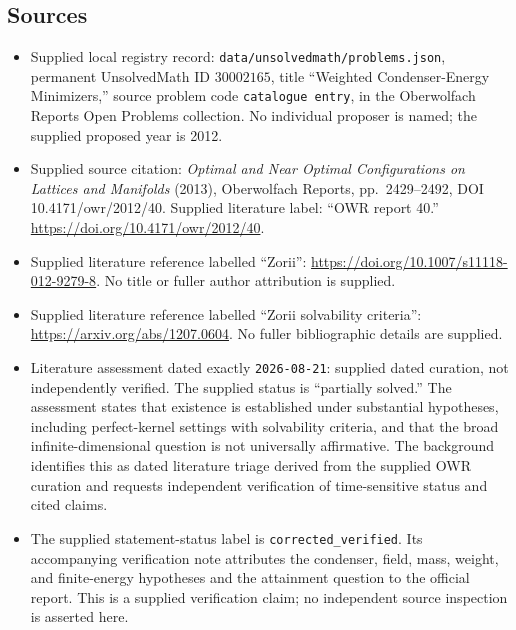 \documentclass[11pt]{article}
\begin{document}
\subsection{Sources}
\begin{itemize}
\item Supplied local registry record: \texttt{data/unsolvedmath/problems.json}, permanent UnsolvedMath ID \(30002165\), title ``Weighted Condenser-Energy Minimizers,'' source problem code \texttt{catalogue entry}, in the Oberwolfach Reports Open Problems collection. No individual proposer is named; the supplied proposed year is 2012.
\item Supplied source citation: \emph{Optimal and Near Optimal Configurations on Lattices and Manifolds} (2013), Oberwolfach Reports, pp.~2429--2492, DOI 10.4171/owr/2012/40. Supplied literature label: ``OWR report 40.'' \url{https://doi.org/10.4171/owr/2012/40}.
\item Supplied literature reference labelled ``Zorii'': \url{https://doi.org/10.1007/s11118-012-9279-8}. No title or fuller author attribution is supplied.
\item Supplied literature reference labelled ``Zorii solvability criteria'': \url{https://arxiv.org/abs/1207.0604}. No fuller bibliographic details are supplied.
\item Literature assessment dated exactly \texttt{2026-08-21}: supplied dated curation, not independently verified. The supplied status is ``partially solved.'' The assessment states that existence is established under substantial hypotheses, including perfect-kernel settings with solvability criteria, and that the broad infinite-dimensional question is not universally affirmative. The background identifies this as dated literature triage derived from the supplied OWR curation and requests independent verification of time-sensitive status and cited claims.
\item The supplied statement-status label is \texttt{corrected\_verified}. Its accompanying verification note attributes the condenser, field, mass, weight, and finite-energy hypotheses and the attainment question to the official report. This is a supplied verification claim; no independent source inspection is asserted here.
\end{itemize}
\end{document}

